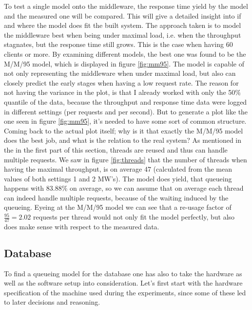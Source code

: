 \documentclass[11pt]{article}
\begin{document}
To test a single model onto the middleware, the response time yield by the model and the measured one will be compared. This will give a detailed insight into if and where the model does fit the built system. The approach taken is to model the middleware best when being under maximal load, i.e. when the throughput stagnates, but the response time still grows. This is the case when having 60 clients or more. By examining different models, the best one was found to be the M/M/95 model, which is displayed in figure \ref{fig:mm95}. The model is capable of not only representing the middleware when under maximal load, but also can closely predict the early stages when having a low request rate. The reason for not having the variance in the plot, is that I already worked with only the 50\% quantile of the data, because the throughput and response time data were logged in different settings (per requests and per second). But to generate a plot like the one seen in figure \ref{fig:mm95}, it's needed to have some sort of common structure. Coming back to the actual plot itself; why is it that exactly the M/M/95 model does the best job, and what is the relation to the real system? As mentioned in the in the first part of this section, threads are reused and thus can handle multiple requests. We saw in figure \ref{fig:threads} that the number of threads when having the maximal throughput, is on average 47 (calculated from the mean values of both settings 1 and 2 MW's). The model does yield, that queueing happens with $83.88\%$ on average, so we can assume that on average each thread can indeed handle multiple requests, because of the waiting induced by the queueing. Eyeing at the M/M/95 model we can see that a re-usage factor of $\frac{95}{47}=2.02$ requests per thread would not only fit the model perfectly, but also does make sense with respect to the measured data.

\subsection{Database}\label{sec:db}
To find a queueing model for the database one has also to take the hardware as well as the software setup into consideration. Let's first start with the hardware specification of the machine used during the experiments, since some of these led to later decisions and reasoning.
\end{document}
